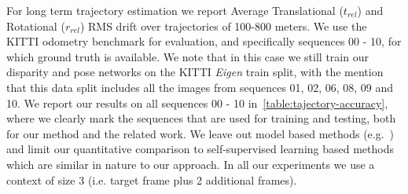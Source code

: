\documentclass[letterpaper, 10 pt, conference]{ieeeconf}  \IEEEoverridecommandlockouts
\begin{document}
For long term trajectory estimation we report Average Translational ($t_{rel}$) and Rotational ($r_{rel}$) RMS drift over trajectories of 100-800 meters. We use the KITTI odometry benchmark for evaluation, and specifically sequences 00 - 10, for which ground truth is available. We note that in this case we still train our disparity and pose networks on the KITTI \textit{Eigen} train split, with the mention that this data split includes all the images from sequences 01, 02, 06, 08, 09 and 10. We report our results on all sequences 00 - 10 in~\ref{table:tajectory-accuracy}, where we clearly mark the sequences that are used for training and testing, both for our method and the related work. We leave out model based methods (e.g.~\cite{mur2017orb,yang2018deep}) and limit our quantitative comparison to self-supervised learning based methods which are similar in nature to our approach. In all our experiments we use a context of size 3 (i.e. target frame plus 2 additional frames).
\end{document}
